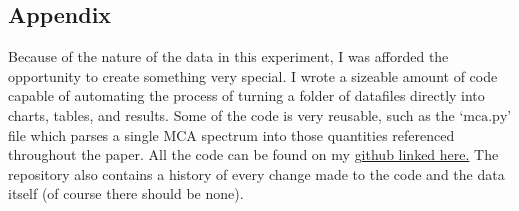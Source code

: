 \documentclass[12pt]{article}
\begin{document}
\begin{multicols}{2}
    \section{Appendix}
    Because of the nature of the data in this experiment, I was afforded the opportunity to create something very special. I wrote a sizeable amount of code capable of automating the process of turning a folder of datafiles directly into charts, tables, and results. Some of the code is very reusable, such as the `$\text{mca.py}$' file which parses a single MCA spectrum into those quantities referenced throughout the paper. All the code can be found on my \href{https://github.com/wabo225/AlphaSpectroscopy/tree/master/AlphaSpectroscopy}{github linked here.} The repository also contains a history of every change made to the code and the data itself (of course there should be none).

    
    
\end{multicols}
\end{document}
